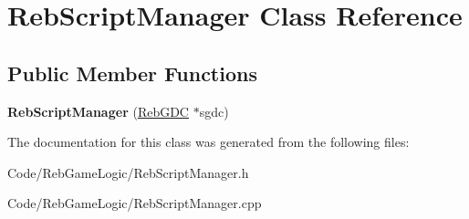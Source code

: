 \hypertarget{class_reb_script_manager}{}\section{Reb\+Script\+Manager Class Reference}
\label{class_reb_script_manager}
\subsection*{Public Member Functions}
\begin{DoxyCompactItemize}
\item 
{\bfseries Reb\+Script\+Manager} (\hyperlink{class_reb_g_d_c}{Reb\+G\+DC} $\ast$sgdc)\hypertarget{class_reb_script_manager_a9b104257fd6c08689e12abea653a5299}{}\label{class_reb_script_manager_a9b104257fd6c08689e12abea653a5299}

\end{DoxyCompactItemize}


The documentation for this class was generated from the following files\+:\begin{DoxyCompactItemize}
\item 
Code/\+Reb\+Game\+Logic/Reb\+Script\+Manager.\+h\item 
Code/\+Reb\+Game\+Logic/Reb\+Script\+Manager.\+cpp\end{DoxyCompactItemize}
